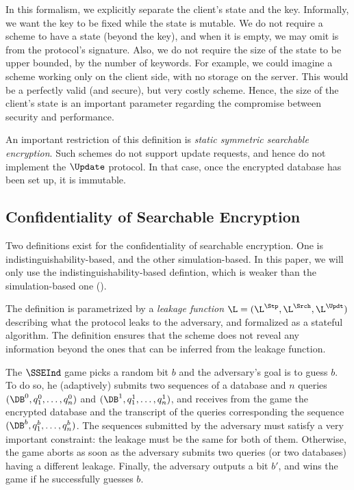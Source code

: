 In this formalism, we explicitly separate the client's state and the key.
Informally, we want the key to be fixed while the state is mutable.
We do not require a scheme to have a state (beyond the key), and when it is empty, we may omit is from the protocol's signature.
Also, we do not require the size of the state to be upper bounded, \eg by the number of keywords. 
For example, we could imagine a scheme working only on the client side, with no storage on the server.
This would be a perfectly valid (and secure), but very costly scheme. 
Hence, the size of the client's state is an important parameter regarding the compromise between security and performance.

An important restriction of this definition is \emph{static symmetric searchable encryption}.
Such schemes do not support update requests, and hence do not implement the $\Update$ protocol.
In that case, once the encrypted database has been set up, it is immutable.

\subsection{Confidentiality of Searchable Encryption} %
\label{sub:se_security}

	Two definitions exist for the confidentiality of searchable encryption. One is indistinguishability-based, and the other simulation-based.
	In this paper, we will only use the indistinguishability-based defintion, which is weaker than the simulation-based one (\cf \cite{CCS:CGKO06}).
	
	The definition is parametrized by a \emph{leakage function} $\L = (\L^\Stp,\L^\Srch,\L^\Updt)$ describing what the protocol leaks to the adversary, and formalized as a stateful algorithm.
	The definition ensures that the scheme does not reveal any information beyond the ones that can be inferred from the leakage function.

The $\SSEInd$ game picks a random bit $b$ and the adversary's goal is to guess $b$.
To do so, he (adaptively) submits two sequences of a database and $n$ queries $(\DB^0,q^0_1,\dots,q^0_n)$ and $(\DB^1,q^1_1,\dots,q^1_n)$, and receives from the game the encrypted database and the transcript of the queries corresponding the sequence  $(\DB^b,q^b_1,\dots,q^b_n)$.
The sequences submitted by the adversary must satisfy a very important constraint: the leakage must be the same for both of them.
Otherwise, the game aborts as soon as the adversary submits two queries (or two databases) having a different leakage.
Finally, the adversary outputs a bit $b'$, and wins the game if he successfully guesses $b$.

